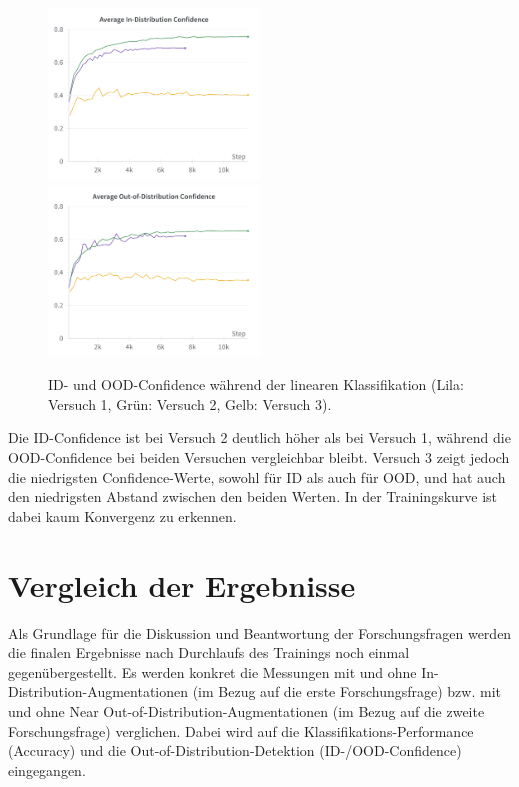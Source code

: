 \begin{figure}[h]
	\centering
	\includegraphics[width=0.5\textwidth]{figure_results_supcon-lin_avg-id-conf.png}%
	\includegraphics[width=0.5\textwidth]{figure_results_supcon-lin_avg-ood-conf.png}
	\caption[ID- und OOD-Confidence während der linearen Klassifikation.]{ID- und OOD-Confidence während der linearen Klassifikation (\textcolor{exp1}{Lila}: Versuch 1, \textcolor{exp2}{Grün}: Versuch 2, \textcolor{exp3}{Gelb}: Versuch 3).}
	\label{fig:supcon-lin-ood-detection}
\end{figure}

Die ID-Confidence ist bei Versuch 2 deutlich höher als bei Versuch 1, während die OOD-Confidence bei beiden Versuchen vergleichbar bleibt. Versuch 3 zeigt jedoch die niedrigsten Confidence-Werte, sowohl für ID als auch für OOD, und hat auch den niedrigsten Abstand zwischen den beiden Werten. In der Trainingskurve ist dabei kaum Konvergenz zu erkennen.

\section{Vergleich der Ergebnisse} \label{sec:results-comparison}

Als Grundlage für die Diskussion und Beantwortung der Forschungsfragen werden die finalen Ergebnisse nach Durchlaufs des Trainings noch einmal gegenübergestellt. Es werden konkret die Messungen mit und ohne In-Distribution-Augmentationen (im Bezug auf die erste Forschungsfrage) bzw. mit und ohne Near Out-of-Distribution-Augmentationen (im Bezug auf die zweite Forschungsfrage) verglichen. Dabei wird auf die Klassifikations-Performance (Accuracy) und die Out-of-Distribution-Detektion (ID-/OOD-Confidence) eingegangen.

